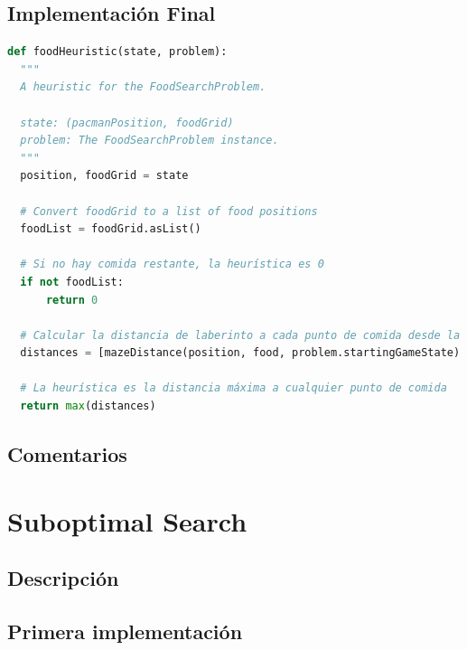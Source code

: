 \documentclass{report}
\begin{document}
        \subsection*{Implementación Final}
          \begin{lstlisting}[language=Python, caption=Implementación final de la heurística del problema de las esquinas]
def foodHeuristic(state, problem):
  """
  A heuristic for the FoodSearchProblem.
  
  state: (pacmanPosition, foodGrid)
  problem: The FoodSearchProblem instance.
  """
  position, foodGrid = state

  # Convert foodGrid to a list of food positions
  foodList = foodGrid.asList()

  # Si no hay comida restante, la heurística es 0
  if not foodList:
      return 0

  # Calcular la distancia de laberinto a cada punto de comida desde la posición actual de Pacman
  distances = [mazeDistance(position, food, problem.startingGameState) for food in foodList]

  # La heurística es la distancia máxima a cualquier punto de comida
  return max(distances)
          \end{lstlisting}
        \subsection*{Comentarios}
      \clearpage\section{Suboptimal Search}
        \subsection*{Descripción}
        \subsection*{Primera implementación}
          \begin{lstlisting}[language=Python, caption=Implementación inicial del problema de las esquinas]
          \end{lstlisting}
\end{document}
